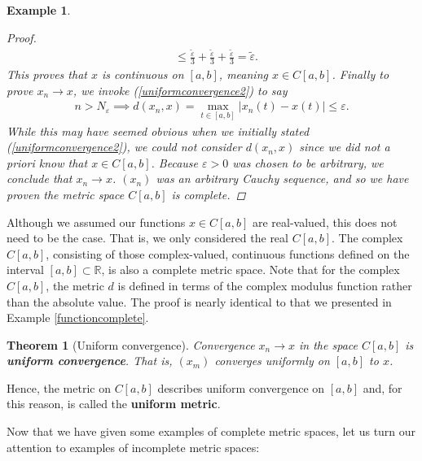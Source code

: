 \documentclass[11pt]{article}
\theoremstyle{mystyle}
\newtheorem{thm}{Theorem}[section]
\newtheorem{protoexamp}{Example}[section]
\newenvironment{examp}
{\colorlet{shadecolor}{orange!15}\begin{shaded}\begin{protoexamp}}
{\end{protoexamp}\end{shaded}}
\begin{document}
\begin{examp}
\begin{proof}
\begin{align*}
    &\leq \frac{\tilde{\varepsilon}}{3} + \frac{\tilde{\varepsilon}}{3} + \frac{\tilde{\varepsilon}}{3} = \tilde{\varepsilon}.
\end{align*}
This proves that $x$ is continuous on $[a, b]$, meaning $x \in C[a, b]$.\newline
Finally to prove $x_n \longrightarrow x$, we invoke (\ref{uniformconvergence2}) to say 
\begin{align*}
    n > N_{\varepsilon} \implies d(x_n, x) = \max_{t \in [a, b]} |x_n(t) - x(t)| \leq \varepsilon.
\end{align*}
While this may have seemed obvious when we initially stated (\ref{uniformconvergence2}), we could not consider $d(x_n, x)$ since we did not a priori know that $x \in C[a, b]$. Because $\varepsilon > 0$ was chosen to be arbitrary, we conclude that $x_n \longrightarrow x$.\newline
$(x_n)$ was an arbitrary Cauchy sequence, and so we have proven the metric space $C[a,b]$ is complete.
\end{proof}
\end{examp}

Although we assumed our functions $x \in C[a,b]$ are real-valued, this does not need to be the case. That is, we only considered the real $C[a,b]$. The complex $C[a,b]$, consisting of those complex-valued, continuous functions defined on the interval $[a,b] \subset \mathbb{R}$, is also a complete metric space. Note that for the complex $C[a,b]$, the metric $d$ is defined in terms of the complex modulus function rather than the absolute value. The proof is nearly identical to that we presented in Example \ref{functioncomplete}.

\begin{thm}[Uniform convergence]
Convergence $x_n \longrightarrow x$ in the space $C[a,b]$ is \textbf{uniform convergence}. That is, $(x_m)$ converges uniformly on $[a,b]$ to $x$.
\end{thm}
Hence, the metric on $C[a,b]$ describes uniform convergence on $[a, b]$ and, for this reason, is called the \textbf{uniform metric}.

Now that we have given some examples of complete metric spaces, let us turn our attention to examples of incomplete metric spaces:
\end{document}
